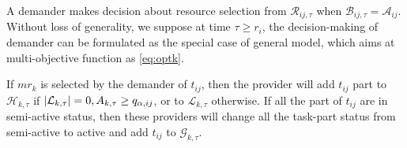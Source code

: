 A demander makes decision about resource selection from $\mathcal{R}_{ij,\tau}$ when $\mathcal{B}_{ij,\tau} = \mathcal{A}_{ij}$. Without loss of generality, we suppose at time $\tau \ge r_i$,
the decision-making of demander can be formulated as the special case of general model, which aims at multi-objective function as \autoref{eq:optk}.


If $mr_k$ is selected by the demander of $t_{ij}$, then the provider will add $t_{ij}$ part to $\mathcal{H}_{k,\tau}$ if $\left|\mathcal{L}_{k,\tau}\right|=0,A_{k,\tau}\ge q_{\alpha,ij}$, or to  $\mathcal{L}_{k,\tau}$ otherwise.
If all the part of $t_{ij}$ are in semi-active status, then these providers will change all the task-part status from semi-active to active and add $t_{ij}$ to $\mathcal{G}_{k,\tau}$.

